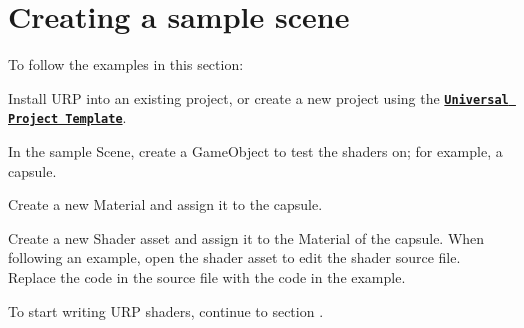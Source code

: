 \chapter{Creating a sample scene}
\hypertarget{md__hey_tea_9_2_library_2_package_cache_2com_8unity_8render-pipelines_8universal_0d14_80_88_2_dofe223bf2789bab8e6dbbf0d7ec59dd2c}{}\label{md__hey_tea_9_2_library_2_package_cache_2com_8unity_8render-pipelines_8universal_0d14_80_88_2_dofe223bf2789bab8e6dbbf0d7ec59dd2c}
\label{md__hey_tea_9_2_library_2_package_cache_2com_8unity_8render-pipelines_8universal_0d14_80_88_2_dofe223bf2789bab8e6dbbf0d7ec59dd2c_autotoc_md2697}%
%
 To follow the examples in this section\+:


\begin{DoxyEnumerate}
\item Install URP into an existing  project, or create a new project using the \href{https://docs.unity3d.com/Packages/com.unity.render-pipelines.universal@8.0/manual/creating-a-new-project-with-urp.html}{\texttt{ {\bfseries{Universal Project Template}}}}.
\item In the sample Scene, create a Game\+Object to test the shaders on; for example, a capsule.


\item Create a new Material and assign it to the capsule.
\item Create a new Shader asset and assign it to the Material of the capsule. When following an example, open the shader asset to edit the  shader source file. Replace the code in the source file with the code in the example.
\end{DoxyEnumerate}

To start writing URP shaders, continue to section . 